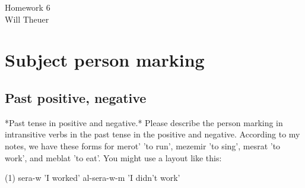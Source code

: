 \documentclass[12pt]{article}
\begin{document}
\begin{center}
{\Large Homework 6} \\
{\large Will Theuer}
\end{center}

\section{Subject person marking}

\subsection{Past positive, negative}
\iffalse
*Past tense in positive and negative.* Please describe the person marking in intransitive verbs in the past tense in the positive and negative. According to my notes, we have these forms for merot' 'to run', mezemir 'to sing', mesrat 'to work', and meblat 'to eat'. You might use a layout like this:

(1)   sera-w 'I worked'                al-sera-w-m 'I didn't work'
\end{document}
